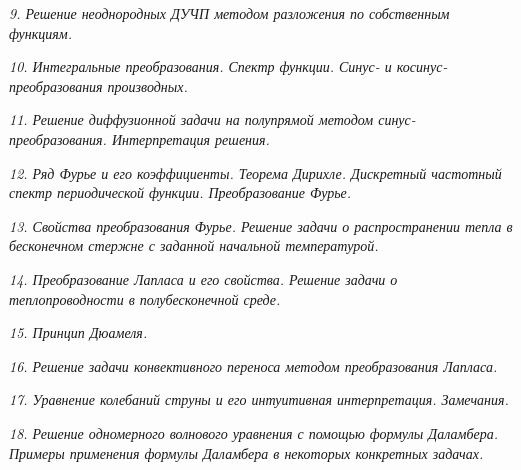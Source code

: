 \emph{9. Решение неоднородных ДУЧП методом разложения по собственным функциям.}

\newpage %

\emph{10. Интегральные преобразования. Спектр функции. Синус- и
косинус-преобразования производных.}

\newpage %

\emph{11. Решение диффузионной задачи на полупрямой методом
синус-преобразования. Интерпретация решения.}

\newpage %

\emph{12. Ряд Фурье и его коэффициенты. Теорема Дирихле. Дискретный частотный
спектр периодической функции. Преобразование Фурье.}

\newpage %

\emph{13. Свойства преобразования Фурье. Решение задачи о распространении тепла
в бесконечном стержне с заданной начальной температурой.}

\newpage %

\emph{14. Преобразование Лапласа и его свойства. Решение задачи о
теплопроводности в полубесконечной среде.}

\newpage %

\emph{15. Принцип Дюамеля.}

\newpage %

\emph{16. Решение задачи конвективного переноса методом преобразования Лапласа.}

\newpage %

\emph{17. Уравнение колебаний струны и его интуитивная интерпретация.
Замечания.}

\newpage %

\emph{18. Решение одномерного волнового уравнения с помощью формулы Даламбера.
Примеры применения формулы Даламбера в некоторых конкретных задачах.}

\newpage %

